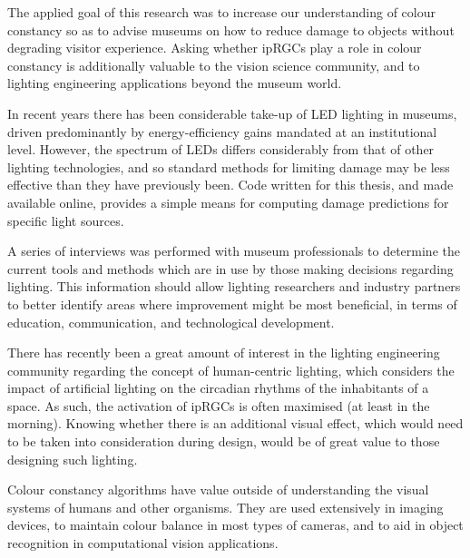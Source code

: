 \begin{impactstatement}

The applied goal of this research was to increase our understanding of colour constancy so as to advise museums on how to reduce damage to objects without degrading visitor experience. Asking whether ipRGCs play a role in colour constancy is additionally valuable to the vision science community, and to lighting engineering applications beyond the museum world.

In recent years there has been considerable take-up of LED lighting in museums, driven predominantly by energy-efficiency gains mandated at an institutional level. However, the spectrum of LEDs differs considerably from that of other lighting technologies, and so standard methods for limiting damage may be less effective than they have previously been. Code written for this thesis, and made available online, provides a simple means for computing damage predictions for specific light sources. 

A series of interviews was performed with museum professionals to determine the current tools and methods which are in use by those making decisions regarding lighting. This information should allow lighting researchers and industry partners to better identify areas where improvement might be most beneficial, in terms of education, communication, and technological development.

There has recently been a great amount of interest in the lighting engineering community regarding the concept of human-centric lighting, which considers the impact of artificial lighting on the circadian rhythms of the inhabitants of a space. As such, the activation of ipRGCs is often maximised (at least in the morning). Knowing whether there is an additional visual effect, which would need to be taken into consideration during design, would be of great value to those designing such lighting.

Colour constancy algorithms have value outside of understanding the visual systems of humans and other organisms. They are used extensively in imaging devices, to maintain colour balance in most types of cameras, and to aid in object recognition in computational vision applications.







\end{impactstatement}
